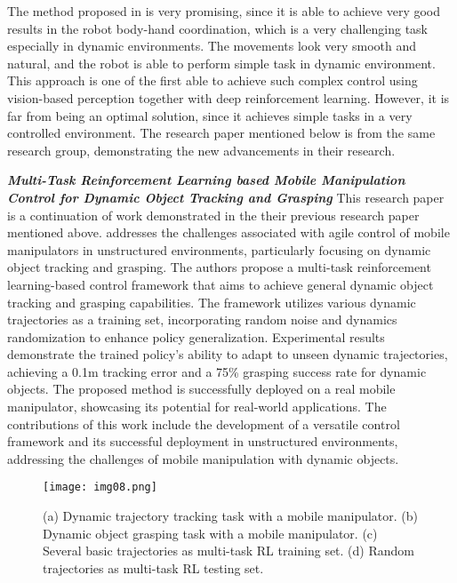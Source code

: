 The method proposed in \cite{wang2020drlmanipulation} is very promising, since it is able to
achieve very good results in the robot body-hand coordination, which is a very challenging task
especially in dynamic environments. The movements look very smooth and natural, and the robot is
able to perform simple task in dynamic environment. This approach is one of the first able
to achieve such complex control using vision-based perception together with deep reinforcement
learning. However, it is far from being an optimal solution, since it achieves simple
tasks in a very controlled environment. The research paper mentioned below is from the same
research group, demonstrating the new advancements in their research.

\textbf{\textit{Multi-Task Reinforcement Learning based Mobile Manipulation 
	Control for Dynamic Object Tracking and Grasping}} \quad
This research paper \cite{wang2022multitask} is a continuation of work demonstrated in the
their previous research paper \cite{wang2020drlmanipulation} mentioned above.
\cite{wang2022multitask} addresses the challenges associated with
agile control of mobile manipulators in unstructured environments, particularly focusing
on dynamic object tracking and grasping. The authors propose a multi-task reinforcement
learning-based control framework that aims to achieve general dynamic object tracking and
grasping capabilities. The framework utilizes various dynamic trajectories as a training set,
incorporating random noise and dynamics randomization to enhance policy generalization.
Experimental results demonstrate the trained policy's ability to adapt to unseen dynamic
trajectories, achieving a 0.1m tracking error and a 75\% grasping success rate for dynamic objects.
The proposed method is successfully deployed on a real mobile manipulator, showcasing its
potential for real-world applications. The contributions of this work include the development
of a versatile control framework and its successful deployment in unstructured environments,
addressing the challenges of mobile manipulation with dynamic objects.

\begin{figure}[H]
	\centering
	\texttt{[image: img08.png]}
	\captionsetup{width=1\linewidth}
	\caption{(a) Dynamic trajectory tracking task with a mobile manipulator. (b)
		Dynamic object grasping task with a mobile manipulator. (c) Several basic
		trajectories as multi-task RL training set. (d) Random trajectories as multi-task
		RL testing set.\cite{wang2022multitask}}
	\label{fig:img08}
\end{figure}

